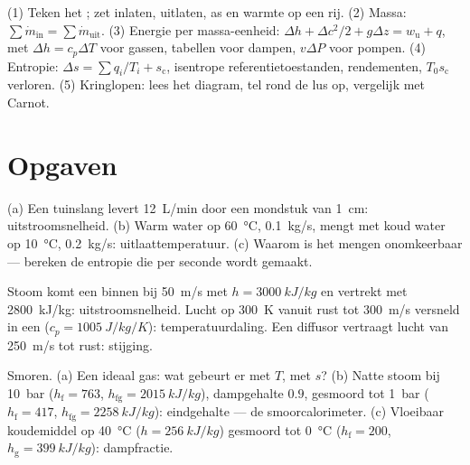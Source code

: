 \begin{method}\label{meth:b2:open-systems:method}
(1) Teken het ; zet inlaten, uitlaten, as en warmte op een rij.
(2) Massa: $\sum\dot m_{\text{in}} = \sum\dot m_{\text{uit}}$. (3) Energie
per massa-eenheid: $\Delta h + \Delta c^2/2 + g\Delta z = w_{\text{u}} + q$, met
$\Delta h = c_p\Delta T$ voor gassen, tabellen voor dampen, $v\Delta P$ voor
pompen. (4) Entropie: $\Delta s = \sum q_i/T_i + s_{\text{c}}$, isentrope
referentietoestanden, rendementen, $T_0s_{\text{c}}$ verloren. (5) Kringlopen: lees
het diagram, tel rond de lus op, vergelijk met Carnot.
\end{method}

\section{Opgaven}

\begin{exercise}[$\star$]\label{exo:b2:open-systems:1}
(a) Een tuinslang levert \qty{12}{L/min} door een mondstuk van \qty{1}{cm}:
uitstroomsnelheid. (b) Warm water op \qty{60}{\celsius}, \qty{0.1}{kg/s},
mengt met koud water op \qty{10}{\celsius}, \qty{0.2}{kg/s}: uitlaat\-temperatuur.
(c) Waarom is het mengen onomkeerbaar --- bereken de
entropie die per seconde wordt gemaakt.
\end{exercise}

\begin{exercise}[$\star$]\label{exo:b2:open-systems:2}
Stoom komt een  binnen bij \qty{50}{m/s} met $h = \qty{3000}{kJ/kg}$ en
vertrekt met \qty{2800}{kJ/kg}: uitstroomsnelheid. Lucht op \qty{300}{K} vanuit rust
tot \qty{300}{m/s} versneld in een  ($c_p = \qty{1005}{J/kg/K}$):
temperatuurdaling. Een diffusor vertraagt lucht van \qty{250}{m/s} tot rust:
stijging.
\end{exercise}

\begin{exercise}[$\star$]\label{exo:b2:open-systems:3}
Smoren. (a) Een ideaal gas: wat gebeurt er met $T$, met $s$? (b) Natte stoom
bij \qty{10}{bar} ($h_{\text{f}} = 763$, $h_{\text{fg}} = \qty{2015}{kJ/kg}$),
dampgehalte $0.9$, gesmoord tot \qty{1}{bar} ($h_{\text{f}} = 417$,
$h_{\text{fg}}
= \qty{2258}{kJ/kg}$): eindgehalte --- de smoorcalorimeter.
(c)
Vloeibaar koudemiddel op \qty{40}{\celsius} ($h = \qty{256}{kJ/kg}$) gesmoord
tot \qty{0}{\celsius} ($h_{\text{f}} = 200$, $h_{\text{g}} = \qty{399}{kJ/kg}$):
dampfractie.
\end{exercise}

